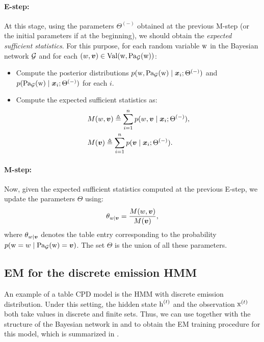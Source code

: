 \paragraph{E-step:} At this stage, using the parameters $\Theta^{(-)}$ obtained at the previous M-step (or the initial parameters if at the beginning), we should obtain the \emph{expected sufficient statistics}. For this purpose, for each random variable ${\textnormal{w}}$ in the Bayesian network ${\mathcal{G}}$ and for each $(w,{\bm{v}}) \in \mathrm{Val}({\textnormal{w}},\mathrm{Pa}_{\mathcal{G}}({\textnormal{w}}))$:
\begin{itemize}
    \item Compute the posterior distributions $p({\textnormal{w}},\mathrm{Pa}_{\mathcal{G}}({\textnormal{w}}) \mid {\bm{x}}_i; \Theta^{(-)})$ and $p(\mathrm{Pa}_{\mathcal{G}}({\textnormal{w}}) \mid {\bm{x}}_i; \Theta^{(-)})$ for each $i$.
    \item Compute the expected sufficient statistics as:
     \begin{align}
         &M(w,{\bm{v}}) \triangleq \sum_{i=1}^n p(w,{\bm{v}} \mid {\bm{x}}_i; \Theta^{(-)}), \label{eq:joint_suf_stat}\\
         &M({\bm{v}}) \triangleq \sum_{i=1}^n p({\bm{v}} \mid {\bm{x}}_i; \Theta^{(-)}). \label{eq:marginal_suf_stat}
     \end{align}
\end{itemize}

\paragraph{M-step:} Now, given the expected sufficient statistics computed at the previous E-step, we update the parameters $\Theta$ using:
\begin{equation}
    \theta_{w \mid {\bm{v}}} = \frac{M(w,{\bm{v}})}{M({\bm{v}})},
\end{equation}
where $\theta_{w \mid {\bm{v}}}$ denotes the table entry corresponding to the probability $p({\textnormal{w}}=w \mid \mathrm{Pa}_{\mathcal{G}}({\textnormal{w}})={\bm{v}})$. The set $\Theta$ is the union of all these parameters.

\subsection{EM for the discrete emission HMM}
An example of a table CPD model is the HMM with discrete emission distribution. Under this setting, the hidden state ${\textnormal{h}}^{(t)}$ and the observation ${\textnormal{x}}^{(t)}$ both take values in discrete and finite sets. Thus, we can use  together with the structure of the Bayesian network in  and  to obtain the EM training procedure for this model, which is summarized in .

